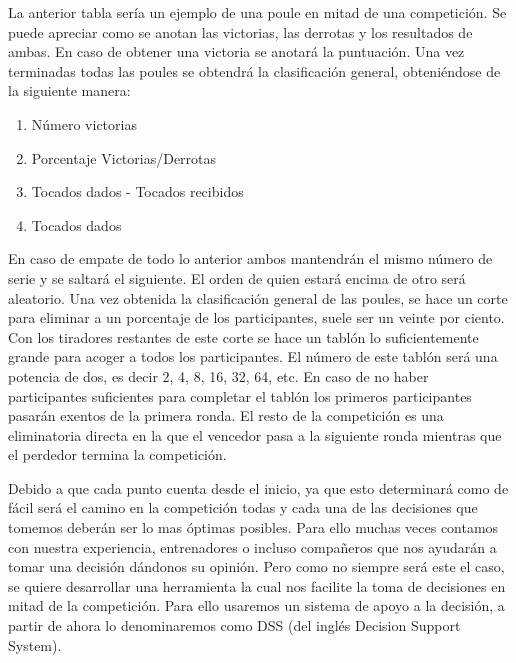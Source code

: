 La anterior tabla sería un ejemplo de una poule en mitad de una competición. Se puede apreciar como se anotan
 las victorias, las derrotas y los resultados de ambas. En caso de obtener una victoria se anotará la puntuación. Una vez
 terminadas todas las poules se obtendrá la clasificación general, obteniéndose de la siguiente manera:

\begin{enumerate}
  \item Número victorias
  \item Porcentaje Victorias/Derrotas
  \item Tocados dados - Tocados recibidos
  \item Tocados dados
\end{enumerate}

En caso de empate de todo lo anterior ambos mantendrán el mismo número de serie y se saltará el siguiente. El orden de
 quien estará encima de otro será aleatorio. Una vez obtenida la clasificación general de las poules, se hace un corte
 para eliminar a un porcentaje de los participantes, suele ser un veinte por ciento. Con los tiradores restantes
 de este corte se hace un tablón lo suficientemente grande para acoger a todos los participantes. El número de este
 tablón será una potencia de dos, es decir 2, 4, 8, 16, 32, 64, etc. En caso de no haber participantes suficientes para completar
 el tablón los primeros participantes pasarán exentos de la primera ronda. El resto de la competición es una eliminatoria
 directa en la que el vencedor pasa a la siguiente ronda mientras que el perdedor termina la competición.

Debido a que cada punto cuenta desde el inicio, ya que esto determinará como de fácil será el camino en la competición
todas y cada una de las decisiones que tomemos deberán ser lo mas óptimas posibles. Para ello muchas veces contamos
con nuestra experiencia, entrenadores o incluso compañeros que nos ayudarán a tomar una decisión dándonos su opinión.
Pero como no siempre será este el caso, se quiere desarrollar una herramienta la cual nos facilite la toma de
decisiones en mitad de la competición. Para ello usaremos un sistema de apoyo a la decisión, a partir de ahora
lo denominaremos como DSS (del inglés Decision Support System).
